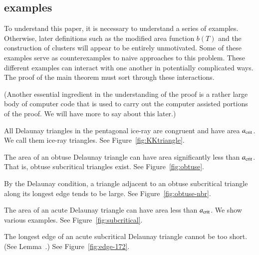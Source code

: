 \subsection{examples}

To understand this paper, it is necessary to understand a series of
examples.  Otherwise, later definitions such as the modified area
function $b(T)$ and the construction of clusters will appear to be
entirely unmotivated.  Some of these examples serve as counterexamples
to naive approaches to this problem.  These different examples can
interact with one another in potentially complicated ways.  The proof
of the main theorem must sort through these interactions.

(Another essential ingredient in the understanding of the proof is a
rather large body of computer code that is used to carry out the
computer assisted portions of the proof.  We will have more to say
about this later.)

\begin{example} 
  All Delaunay triangles in the pentagonal ice-ray are congruent and
  have area $a_\text{crit}$.  We call them ice-ray triangles. See
  Figure~\ref{fig:KKtriangle}.
\end{example}


\begin{example}  
  The area of an obtuse Delaunay triangle can have area significantly
  less than $a_\text{crit}$.  That is, obtuse subcritical triangles exist.
  See Figure~\ref{fig:obtuse}.
\end{example}


\begin{example} 
  By the Delaunay condition, a triangle adjacent to an obtuse
  subcritical triangle along its longest edge tends to be large. See
  Figure~\ref{fig:obtuse-nbr}.
\end{example}


\begin{example} 
  The area of an acute Delaunay triangle can have area less than
  $a_\text{crit}$.  We show various examples.  See
  Figure~\ref{fig:subcritical}.
\end{example}


\begin{example} 
  The longest edge of an acute subcritical Delaunay triangle cannot be
  too short.  (See Lemma~.) See
  Figure~\ref{fig:edge-172}.
\end{example}

